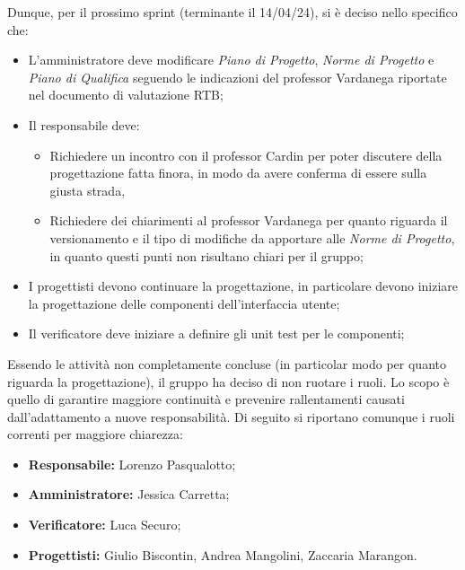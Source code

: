 \noindent Dunque, per il prossimo sprint (terminante il 14/04/24), si è deciso nello specifico che:
\begin{itemize}
    \item L'amministratore deve modificare \textit{Piano di Progetto},  \textit{Norme di Progetto} e \textit{Piano di Qualifica} seguendo le indicazioni del professor Vardanega riportate nel documento di valutazione RTB;
    \item Il responsabile deve:
        \begin{itemize}
            \item Richiedere un incontro con il professor Cardin per poter discutere della progettazione fatta finora, in modo da avere conferma di essere sulla giusta strada,
            \item Richiedere dei chiarimenti al professor Vardanega per quanto riguarda il versionamento e il tipo di modifiche da apportare alle \textit{Norme di Progetto}, in quanto questi punti non risultano chiari per il gruppo;
        \end{itemize}
    \item I progettisti devono continuare la progettazione, in particolare devono iniziare la progettazione delle componenti dell'interfaccia utente;
    \item Il verificatore deve iniziare a definire gli unit test per le componenti;
\end{itemize}
\bigskip

\noindent Essendo le attività non completamente concluse (in particolar modo per quanto riguarda la progettazione), il gruppo ha deciso di non ruotare i ruoli. Lo scopo è quello di garantire maggiore continuità e prevenire rallentamenti causati dall'adattamento a nuove responsabilità.
Di seguito si riportano comunque i ruoli correnti per maggiore chiarezza:
\begin{itemize}
    \item \textbf{Responsabile:} Lorenzo Pasqualotto;
    \item \textbf{Amministratore:} Jessica Carretta;
    \item \textbf{Verificatore:} Luca Securo;
    \item \textbf{Progettisti:} Giulio Biscontin, Andrea Mangolini, Zaccaria Marangon.
\end{itemize}